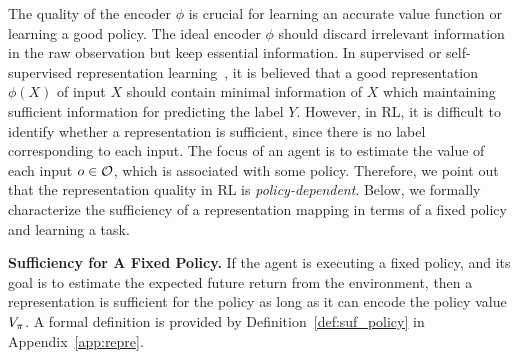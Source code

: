 The quality of the encoder $\phi$ is crucial for learning an accurate value function or learning a good policy. The ideal encoder $\phi$ should discard irrelevant information in the raw observation but keep essential information. 
In supervised or self-supervised representation learning~\citep{chen2020simple,achille2018emergence}, it is believed that a good representation $\phi(X)$ of input $X$ should contain minimal information of $X$ which maintaining sufficient information for predicting the label $Y$.
However, in RL, it is difficult to identify whether a representation is sufficient, since there is no label corresponding to each input. 
The focus of an agent is to estimate the value of each input $o\in\mathcal{O}$, which is associated with some policy. Therefore, we point out that the representation quality in RL is \emph{policy-dependent}. 
Below, we formally characterize the sufficiency of a representation mapping in terms of a fixed policy and learning a task. 

\textbf{Sufficiency for A Fixed Policy.} If the agent is executing a fixed policy, and its goal is to estimate the expected future return from the environment, then a representation is sufficient for the policy as long as it can encode the policy value $V_\pi$. A formal definition is provided by Definition~\ref{def:suf_policy} in Appendix~\ref{app:repre}.



